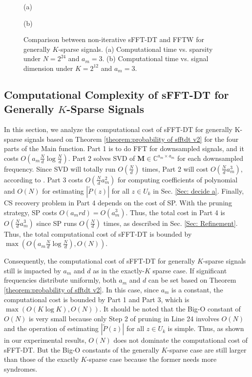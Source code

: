 \documentclass[journal,onecolumn,11pt]{IEEEtran}
\begin{document}
\begin{figure*}[!t]
\begin{minipage}[b]{.48\linewidth}
  \centerline{(a)}
\end{minipage}
\begin{minipage}[b]{.48\linewidth}
  \centerline{(b)}
\end{minipage}
\hfill
\caption{Comparison between non-iterative sFFT-DT and FFTW for generally $K$-sparse signals. (a) Computational time vs. sparsity under $N=2^{24}$ and $a_{m}=3$. (b) Computational time vs. signal dimension under $K=2^{12}$ and $a_{m}=3$. }
\label{fig:general computational time}
\end{figure*}

\subsection{Computational Complexity of sFFT-DT for Generally $K$-Sparse Signals}\label{Sec: Complexity  for General Ksparse Signal}
In this section, we analyze the computational cost of sFFT-DT for generally K-sparse signals based on Theorem \ref{theorem:probability of sfftdt v2} for the four parts of the Main function. 
Part 1 is to do FFT for downsampled signals, and it costs $  O( a_{m} \frac{N}{d}\log \frac{N}{d})$.
Part 2 solves SVD of $\bm{M} \in \mathbb{C}^{a_{m}\times a_{m}}$ for each downsampled frequency.
Since SVD will totally run $  O(\frac{N}{d})$ times, Part 2 will cost $ O(  \frac{N}{d}  a_{m}^{3})$, according to \cite{Angelika1988}.
Part 3 costs $O(\frac{N}{d} a_{m}^2)$ for computing coefficients of polynomial and $O(N)$ for estimating $|\tilde{P}(z)|$ for all $z \in U_{k}$ in Sec. \ref{Sec: decide a}.
Finally, CS recovery problem in Part 4 depends on the cost of SP.
With the pruning strategy, SP costs $O(a_{m}rd)=O(a_{m}^{3})$.
Thus, the total cost in Part 4 is $O(\frac{N}{d}a_{m}^{3})$ since SP runs $O(\frac{N}{d})$ times, as described in Sec. \ref{Sec: Refinement}.
Thus, the total computational cost of sFFT-DT is bounded by $\max(O( a_{m} \frac{N}{d}\log \frac{N}{d}),O(N))$.

Consequently, the computational cost of sFFT-DT for generally $K$-sparse signals still is impacted by $a_{m}$ and $d$ as in the exactly-$K$ sparse case.
If significant frequencies distribute uniformly, both $a_{m}$ and $d$ can be set based on Theorem \ref{theorem:probability of sfftdt v2}.
In this case, since $a_{m}$ is a constant, the computational cost is bounded by Part 1 and Part 3, which is $\max(O(K \log K),O(N))$.
It should be noted that the Big-O constant of $O(N)$ is very small because only Step 2 of pruning in Line 24 involves $O(N)$ and the operation of estimating $|\tilde{P}(z)|$ for all $z \in U_{k}$ is simple.
Thus, as shown in our experimental results, $O(N)$ does not dominate the computational cost of sFFT-DT.
But the Big-O constants of the generally $K$-sparse case are still larger than those of the exactly $K$-sparse case because the former needs more syndromes.
\end{document}
